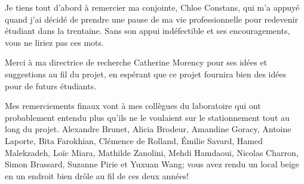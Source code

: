 %

%

Je tiens tout d'abord à remercier ma conjointe, Chloe Constans, qui m'a appuyé quand j'ai décidé de prendre une pause de ma vie professionnelle pour redevenir étudiant dans la trentaine. Sans son appui indéfectible et ses encouragements, vous ne liriez pas ces mots.

Merci à ma directrice de recherche Catherine Morency pour ses idées et suggestions au fil du projet, en espérant que ce projet fournira  bien des idées pour de futurs étudiants.

Mes remerciements finaux vont à mes collègues du laboratoire qui ont probablement entendu plus qu'ils ne le voulaient sur le stationnement tout au long du projet. Alexandre Brunet, Alicia Brodeur, Amandine Goracy, Antoine Laporte, Bita Farokhian, Clémence de Rolland, Émilie Savard, Hamed Malekzadeh, Loïc Miara, Mathilde Zanolini, Mehdi Hamdaoui, Nicolas Charron, Simon Brassard, Suzanne Pirie et Yuxuan Wang; vous avez rendu un local beige en un endroit bien drôle au fil de ces deux années!

 

